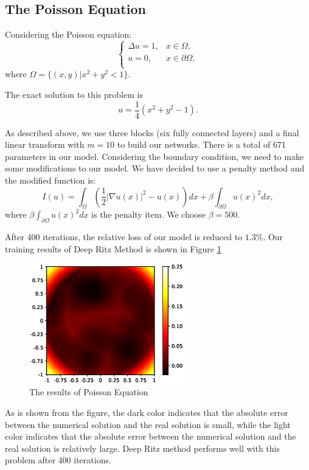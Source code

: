\documentclass{article}
\begin{document}
\subsection{The Poisson Equation}
\par Considering the Poisson equation:
\begin{equation}
	\begin{cases}
 		\Delta u=1, & x\in \Omega, \\
 		u=0, & x\in \partial \Omega, \\
 	\end{cases}
\end{equation}
where $\Omega =\{(x,y)| x^2+y^2<1\}$.
\par The exact solution to this problem is 
\begin{equation}
u=\frac{1}{4}(x^2+y^2-1).
\end{equation}

\par As described above, we use three blocks (six fully connected layers) and a final linear transform with $m=10$ to build our networks. There is a total of 671 parameters in our model. Considering the boundary condition, we need to make some modifications to our model. We have decided to use a penalty method and the modified function is:
\begin{equation}\label{functional}
I(u)=\int_{\Omega}\left(\frac{1}{2}|\nabla u(x)|^2-u(x)\right)dx+\beta\int_{\partial \Omega}u(x)^2dx,
\end{equation}
where $\beta\int_{\partial \Omega}u(x)^2dx$ is the penalty item. We choose $\beta=500$.
\par After 400 iterations, the relative loss of our model is reduced to $1.3\%$. Our training results of Deep Ritz Method is shown in Figure \ref{3.1a}

\begin{figure}[ht]
 	 \centering
 	 \includegraphics[width=0.6\textwidth]{./images/loss_3-1.eps} 
	 \caption {The results of Poisson Equation}
	 \label{3.1a}
\end{figure}
As is shown from the figure, the dark color indicates that the absolute error between the numerical solution and the real solution is small, while the light color indicates that the absolute error between the numerical solution and the real solution is relatively large. Deep Ritz method performs well with this problem after 400 iterations.
\end{document}
